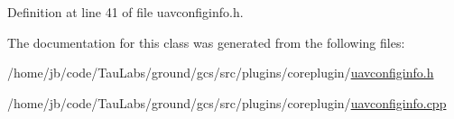 \-Definition at line 41 of file uavconfiginfo.\-h.



\-The documentation for this class was generated from the following files\-:\begin{DoxyCompactItemize}
\item 
/home/jb/code/\-Tau\-Labs/ground/gcs/src/plugins/coreplugin/\hyperlink{uavconfiginfo_8h}{uavconfiginfo.\-h}\item 
/home/jb/code/\-Tau\-Labs/ground/gcs/src/plugins/coreplugin/\hyperlink{uavconfiginfo_8cpp}{uavconfiginfo.\-cpp}\end{DoxyCompactItemize}
